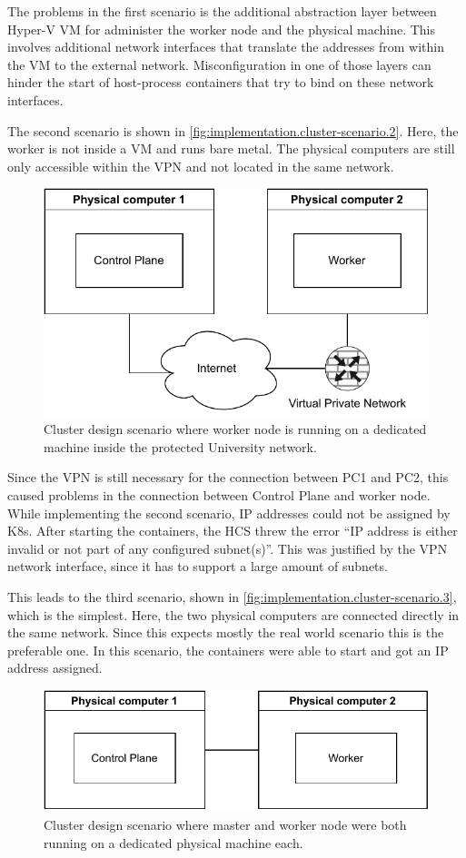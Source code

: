 The problems in the first scenario is the additional abstraction layer between Hyper-V \ac{VM} for administer the worker node and the physical machine. This involves additional network interfaces that translate the addresses from within the \ac{VM} to the external network. Misconfiguration in one of those layers can hinder the start of host-process containers that try to bind on these network interfaces.

The second scenario is shown in \autoref{fig:implementation.cluster-scenario.2}. Here, the worker is not inside a \ac{VM} and runs bare metal. The physical computers are still only accessible within the \ac{VPN} and not located in the same network.
\begin{figure}[ht]
\centering
\includegraphics[width=.8\textwidth]{Figures/Cluster-scenarios-2.pdf}
\caption{Cluster design scenario where worker node is running on a dedicated machine inside the protected University network.}
\label{fig:implementation.cluster-scenario.2}
\end{figure}
Since the \ac{VPN} is still necessary for the connection between PC1 and PC2, this caused problems in the connection between Control Plane and worker node. While implementing the second scenario, \ac{IP} addresses could not be assigned by \ac{K8s}. After starting the containers, the \ac{HCS} threw the error \enquote{IP address is either invalid or not part of any configured subnet(s)}. This was justified by the \ac{VPN} network interface, since it has to support a large amount of subnets.

This leads to the third scenario, shown in \autoref{fig:implementation.cluster-scenario.3}, which is the simplest. Here, the two physical computers are connected directly in the same network. Since this expects mostly the real world scenario this is the preferable one. In this scenario, the containers were able to start and got an \ac{IP} address assigned.
\begin{figure}[hb]
	\centering
	\includegraphics[width=.8\textwidth]{Figures/Cluster-scenarios-3.pdf}
	\caption{Cluster design scenario where master and worker node were both running on a dedicated physical machine each.}
	\label{fig:implementation.cluster-scenario.3}
\end{figure}


